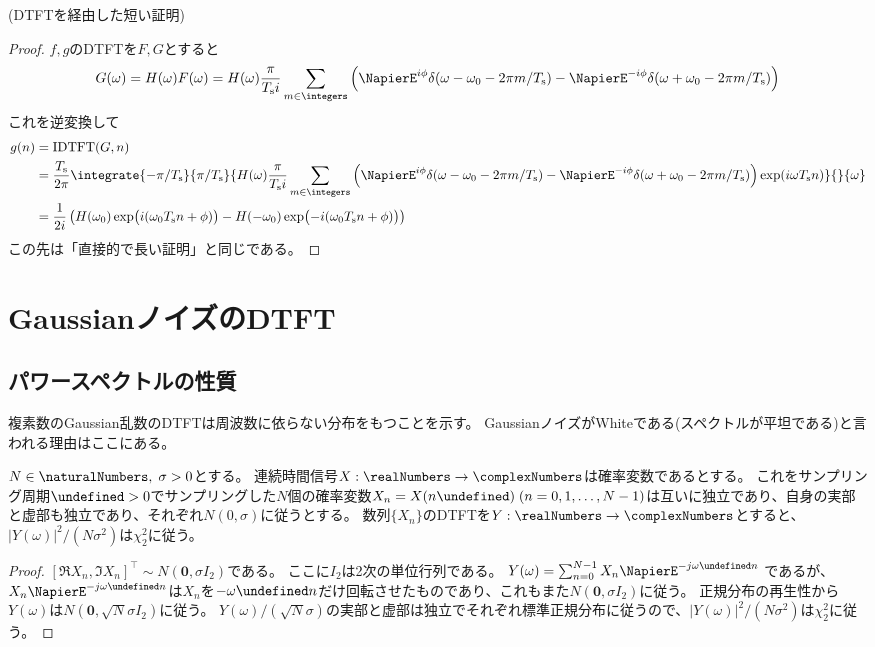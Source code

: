         (DTFTを経由した短い証明)
        \begin{proof}
            \quad\par
            $f,g$のDTFTを$F,G$とすると
            \[ G(\omega) = H(\omega)F(\omega) = H(\omega)\frac{\pi}{\Ts i}\sum_{m\in\integers}\left(\NapierE^{i\phi}\delta(\omega-\omega_0 - 2\pi m/\Ts) - \NapierE^{-i\phi}\delta(\omega+\omega_0 - 2\pi m/\Ts)\right) \]
            これを逆変換して
            \begin{align*}
                g(n) &= \text{IDTFT}(G,n) \\
                &= \frac{\Ts}{2\pi}\integrate{-\pi/\Ts}{\pi/\Ts}{H(\omega)\frac{\pi}{\Ts i}\sum_{m\in\integers}\left(\NapierE^{i\phi}\delta(\omega-\omega_0 - 2\pi m/\Ts) - \NapierE^{-i\phi}\delta(\omega+\omega_0 - 2\pi m/\Ts)\right)\exp(i\omega\Ts n)}{}{\omega} \\
                &= \frac{1}{2i}\left(H(\omega_0)\exp\bigl(i(\omega_0\Ts n+\phi)\bigr) - H(-\omega_0)\exp\bigl(-i(\omega_0\Ts n+\phi)\bigr)\right)
            \end{align*}
            この先は「直接的で長い証明」と同じである。
        \end{proof}
        \let\Ts\undefined
    \section{GaussianノイズのDTFT}
        \newcommand{\Ts}{\Tsamp}
        \subsection{パワースペクトルの性質}
            \label{GaussianノイズのDTFTのパワースペクトル}
            複素数のGaussian乱数のDTFTは周波数に依らない分布をもつことを示す。
            GaussianノイズがWhiteである(スペクトルが平坦である)と言われる理由はここにある。
            \begin{shadebox}
                $N\in\naturalNumbers,\;\sigma>0$とする。
                連続時間信号$X:\realNumbers\to\complexNumbers$は確率変数であるとする。
                これをサンプリング周期$\Ts>0$でサンプリングした$N$個の確率変数$X_n = X(n\Ts)\;(n=0,1,\dots,N-1)$は互いに独立であり、自身の実部と虚部も独立であり、それぞれ$N(0,\sigma)$に従うとする。
                数列$\{X_n\}$のDTFTを$Y:\realNumbers\to\complexNumbers$とすると、$|Y(\omega)|^2/(N\sigma^2)$は$\chi_2^2$に従う。
            \end{shadebox}
            \begin{proof}
                \quad\par
                $[\Re{X_n}, \Im{X_n}]^\top \sim N(\bm{0}, \sigma I_2)$である。
                ここに$I_2$は2次の単位行列である。
                $Y(\omega) = \sum_{n=0}^{N-1} X_n \NapierE^{-j\omega\Ts n}$
                であるが、$X_n \NapierE^{-j\omega\Ts n}$は$X_n$を$-\omega\Ts n$だけ回転させたものであり、これもまた$N(\bm{0}, \sigma I_2)$に従う。
                正規分布の再生性から$Y(\omega)$は$N(\bm{0}, \sqrt{N}\sigma I_2)$に従う。
                $Y(\omega)/(\sqrt{N}\sigma)$の実部と虚部は独立でそれぞれ標準正規分布に従うので、$|Y(\omega)|^2/(N\sigma^2)$は$\chi_2^2$に従う。
            \end{proof}
